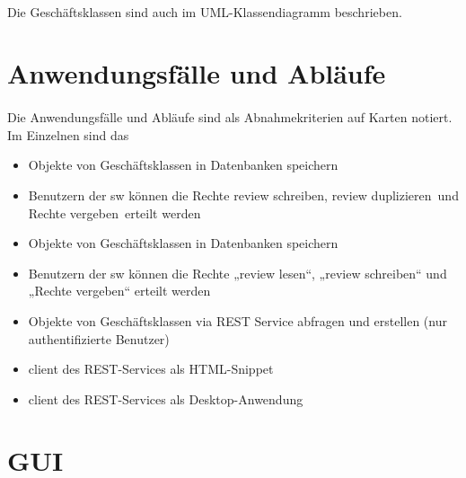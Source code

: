 \documentclass{article}
\begin{document}
\paragraph{}
Die Geschäftsklassen sind auch im UML-Klassendiagramm beschrieben.

\section{Anwendungsfälle und Abläufe}
\paragraph{}
Die Anwendungsfälle und Abläufe sind als Abnahmekriterien auf Karten notiert. Im Einzelnen sind das
\begin{itemize}
  \item Objekte von Geschäftsklassen in Datenbanken speichern
  \item Benutzern der \gls{sw} können die Rechte \glqq \gls{review} schreiben\grqq, \glqq \gls{review} duplizieren\grqq\ und \glqq Rechte vergeben\grqq\ erteilt werden
  \item Objekte von Geschäftsklassen in Datenbanken speichern
  \item Benutzern der \gls{sw} können die Rechte „\gls{review} lesen“, „\gls{review} schreiben“ und „Rechte vergeben“ erteilt werden
  \item Objekte von Geschäftsklassen via  REST Service abfragen und erstellen (nur authentifizierte Benutzer)
  \item \gls{client} des REST-Services als HTML-Snippet
  \item \gls{client} des REST-Services als Desktop-Anwendung
\end{itemize}

\pagebreak

\section{GUI}
\end{document}
